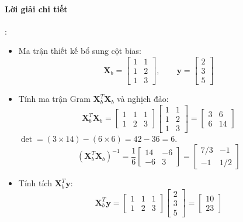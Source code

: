 \paragraph{Lời giải chi tiết}:
\begin{itemize}
  \item[1)] Ma trận thiết kế bổ sung cột bias:
  \begin{equation*}
  \mathbf{X}_b = \begin{bmatrix} 1 & 1 \\ 1 & 2 \\ 1 & 3 \end{bmatrix}, \qquad \mathbf{y} = \begin{bmatrix} 2 \\ 3 \\ 5 \end{bmatrix}
  \end{equation*}
  \item[2)] Tính ma trận Gram $\mathbf{X}_b^T \mathbf{X}_b$ và nghịch đảo:
  \begin{equation*}
  \mathbf{X}_b^T \mathbf{X}_b = \begin{bmatrix} 1 & 1 & 1 \\ 1 & 2 & 3 \end{bmatrix} \begin{bmatrix} 1 & 1 \\ 1 & 2 \\ 1 & 3 \end{bmatrix} = \begin{bmatrix} 3 & 6 \\ 6 & 14 \end{bmatrix}
  \end{equation*}
  $\det = (3 \times 14) - (6 \times 6) = 42 - 36 = 6$.
  \begin{equation*}
  (\mathbf{X}_b^T \mathbf{X}_b)^{-1} = \frac{1}{6} \begin{bmatrix} 14 & -6 \\ -6 & 3 \end{bmatrix} = \begin{bmatrix} 7/3 & -1 \\ -1 & 1/2 \end{bmatrix}
  \end{equation*}
  \item[3)] Tính tích $\mathbf{X}_b^T \mathbf{y}$:
  \begin{equation*}
  \mathbf{X}_b^T \mathbf{y} = \begin{bmatrix} 1 & 1 & 1 \\ 1 & 2 & 3 \end{bmatrix} \begin{bmatrix} 2 \\ 3 \\ 5 \end{bmatrix} = \begin{bmatrix} 10 \\ 23 \end{bmatrix}

\end{equation*}
\end{itemize}
